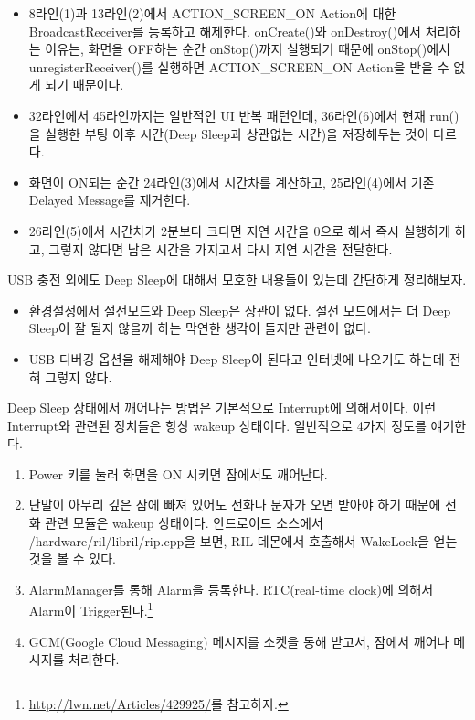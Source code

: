 \begin{itemize}
\item 8라인(1)과 13라인(2)에서 ACTION\_SCREEN\_ON Action에 대한 BroadcastReceiver를 등록하고 해제한다. onCreate()와 onDestroy()에서 처리하는 이유는, 화면을 OFF하는 순간 onStop()까지 실행되기 때문에 onStop()에서 unregisterReceiver()를 실행하면 ACTION\_SCREEN\_ON Action을 받을 수 없게 되기 때문이다.
\item 32라인에서 45라인까지는 일반적인 UI 반복 패턴인데, 36라인(6)에서 현재 run()을 실행한 부팅 이후 시간(Deep Sleep과 상관없는 시간)을 저장해두는 것이 다르다.
\item 화면이 ON되는 순간 24라인(3)에서 시간차를 계산하고, 25라인(4)에서 기존 Delayed Message를 제거한다.
\item 26라인(5)에서 시간차가 2분보다 크다면 지연 시간을 0으로 해서 즉시 실행하게 하고, 그렇지 않다면 남은 시간을 가지고서 다시 지연 시간을 전달한다.
\end{itemize}

USB 충전 외에도 Deep Sleep에 대해서 모호한 내용들이 있는데 간단하게 정리해보자.
\begin{itemize}
\item 환경설정에서 절전모드와 Deep Sleep은 상관이 없다. 절전 모드에서는 더 Deep Sleep이 잘 될지 않을까 하는 막연한 생각이 들지만 관련이 없다.
\item USB 디버깅 옵션을 해제해야 Deep Sleep이 된다고 인터넷에 나오기도 하는데 전혀 그렇지 않다.
\end{itemize}


Deep Sleep 상태에서 깨어나는 방법은 기본적으로 Interrupt에 의해서이다. 
이런 Interrupt와 관련된 장치들은 항상 wakeup 상태이다.
일반적으로 4가지 정도를 얘기한다. 
\begin{enumerate}
\item Power 키를 눌러 화면을 ON 시키면 잠에서도 깨어난다.
\item 단말이 아무리 깊은 잠에 빠져 있어도 전화나 문자가 오면 받아야 하기 때문에 전화 관련 모듈은 wakeup 상태이다. 안드로이드 소스에서 /hardware/ril/libril/rip.cpp을 보면, RIL 데몬에서 호출해서 WakeLock을 얻는 것을 볼 수 있다.
\item AlarmManager를 통해 Alarm을 등록한다. RTC(real-time clock)에 의해서 Alarm이 Trigger된다.\footnote{\url{http://lwn.net/Articles/429925/}를 참고하자.}
\item GCM(Google Cloud Messaging) 메시지를 소켓을 통해 받고서, 잠에서 깨어나 메시지를 처리한다.
\end{enumerate}
 
